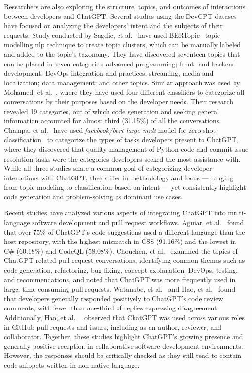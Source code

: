 Researchers are also exploring the structure, topics, and outcomes of interactions between developers and ChatGPT. Several studies using the DevGPT dataset have focused on analyzing the developers' intent and the subjects of their requests. Study conducted by Sagdic, et al.~\cite{sagdic2024-devgpt-taxonomy} have used BERTopic~\cite{grootendorst2022bertopicneuraltopicmodeling} topic modelling \acrshort{nlp} technique to create topic clusters, which can be manually labeled and added to the topic's taxonomy. They have discovered seventeen topics that can be placed in seven categories: advanced programming; front- and backend development; DevOps integration and practices; streaming, media and localization; data management; and other topics. Similar approach was used by Mohamed, et al.~\cite{Mohamed2024-topics}, where they have used four different classifiers to categorize all conversations by their purposes based on the developer needs. Their research revealed 19 categories, out of which code generation and seeking general information accounted for almost third (31.15\%) of all the conversations. Champa, et al.~\cite{champa2024-gpt-use} have used \textit{facebook/bart-large-mnli} model for zero-shot classification~\cite{lewis2019bartdenoisingsequencetosequencepretraining} to categorize the types of tasks developers present to ChatGPT, where they discovered that quality management of Python code and commit issue resolution tasks were the categories developers seeked the most assistance with. While all three studies share a common goal of categorizing developer interactions with ChatGPT, they differ in methodology and focus --- ranging from topic modeling to classification based on intent --- yet consistently highlight code generation and problem-solving as dominant use cases.

Recent studies have analyzed various aspects of integrating ChatGPT into multi-language software development and pull request workflows. Aguiar, et al.~\cite{aguiar-multilang-chatgpt} found that over 75\% of ChatGPT's code suggestions used a different language than the host repository, with the highest mismatch in CSS (91.16\%) and the lowest in C\# (60.18\%) and CodeQL (58.08\%). Chouchen, et al.~\cite{chouchen2024-pr-how} examined the topics of ChatGPT-related pull request conversations, identifying common themes such as code generation, refactoring, bug fixing, concept explanation, DevOps, testing, and recommendations, and noted that ChatGPT was more frequently used in large, time-consuming pull requests. Watanabe, et al.~\cite{watanabe-code-review-chatgpt} and Hao, et al.~\cite{Hao2024-pr-exporatory} found that developers generally responded positively to ChatGPT's code review comments, with fewer than one-third of replies expressing disagreement. Additionally, Hao, et al.~~\cite{Hao2024-pr-empirical} observed that ChatGPT was used across various roles in GitHub pull requests and issues, including as an author, reviewer, and collaborator. Together, these studies highlight ChatGPT’s growing presence and generally positive reception in collaborative software development environments. However, the responses should be critically checked as they still tend to contain code snippets written in non-native language. 

